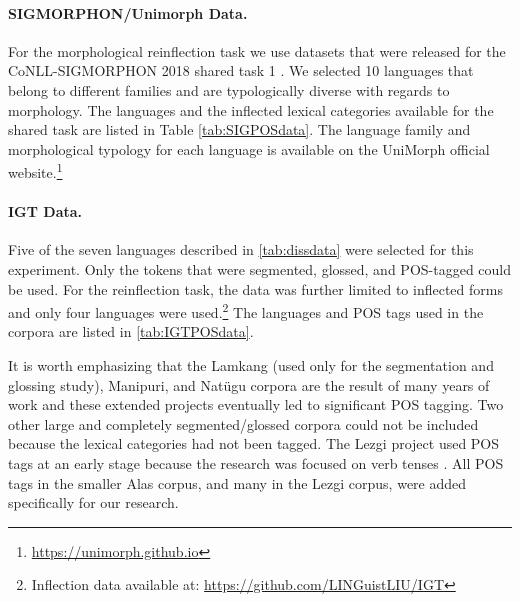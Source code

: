 \paragraph{SIGMORPHON/Unimorph Data.}
For the morphological reinflection task we use datasets that were released for the CoNLL-SIGMORPHON 2018 shared task 1 \citep{cotterell_conllsigmorphon_2018}. We selected 10 languages that belong to different families and are typologically diverse with regards to morphology. The languages and the inflected lexical categories available for the shared task are listed in Table \ref{tab:SIGPOSdata}. The language family and morphological typology for each language is available on the UniMorph official website.\footnote{\url{https://unimorph.github.io}}  


\paragraph{IGT Data.}
Five of the seven languages described in \ref{tab:dissdata} were selected for this experiment. Only the tokens that were segmented, glossed, and POS-tagged could be used. For the reinflection task, the data was further limited to inflected forms and only four languages were used.\footnote{Inflection data available at: \url{https://github.com/LINGuistLIU/IGT}} The languages and POS tags used in the corpora are listed in \ref{tab:IGTPOSdata}.

It is worth emphasizing that the Lamkang (used only for the segmentation and glossing study), Manipuri, and Nat\"ugu corpora are the result of many years of work and these extended projects eventually led to significant POS tagging. Two other large and completely segmented/glossed corpora could not be included because the lexical categories had not been tagged. The Lezgi project used POS tags at an early stage because the research was focused on verb tenses \citep{donet_importance_2014}. All POS tags in the smaller Alas corpus, and many in the Lezgi corpus, were added specifically for our research. 



